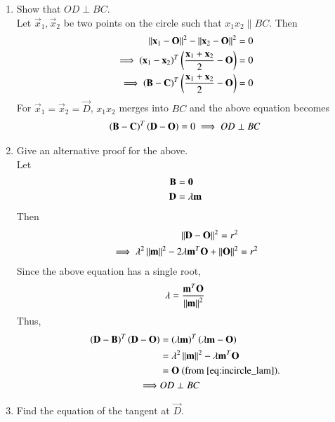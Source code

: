 \begin{enumerate}[label=\arabic*.,ref=\thesubsection.\theenumi]
\item Show that $OD \perp BC$.
%
\\
\solution Let $\vec{x}_1,\vec{x}_2$ be two points on the circle such that 
$x_1x_2 \parallel BC$. Then
%
\begin{align}
\left\lVert\mathbf{x}_1-\mathbf{O}\right\rVert^2- 
\left\lVert\mathbf{x}_2-\mathbf{O}\right\rVert^2 &= 0 
\\
\implies 
\left(\mathbf{x}_1-\mathbf{x}_2\right)^T\left(\frac{\mathbf{x}_1+\mathbf{x}_2}{2}-\mathbf{O}\right) &= 
0 
\\
\implies 
\left(\mathbf{B}-\mathbf{C}\right)^T\left(\frac{\mathbf{x}_1+\mathbf{x}_2}{2}-\mathbf{O}\right) &= 
0 
\end{align}
%
For $\vec{x}_1=\vec{x}_2=\vec{D}$, $x_1x_2$ merges into $BC$ and the above 
equation becomes 
%
\begin{align}
\left(\mathbf{B}-\mathbf{C}\right)^T\left(\mathbf{D}-\mathbf{O}\right) = 
0 
\implies OD \perp BC
\end{align}
%
\item Give an alternative proof for the above.
\\
\solution Let 
\begin{align}
\mathbf{B} & = \mathbf{0}
\\
\mathbf{D} &= \lambda \mathbf{m}
\end{align}
Then
\begin{align}
\left\lVert\mathbf{D} - \mathbf{O}\right\rVert^2 = r^2 &
\\
\implies \lambda^2\left\lVert\mathbf{m}\right\rVert^2 - 2\lambda\mathbf{m}^T\mathbf{O} + \left\lVert\mathbf{O}\right\rVert^2 &= r^2 
\end{align}
Since the above equation has a single root,
\begin{align}
\lambda = \frac{\mathbf{m}^T\mathbf{O}}{\left\lVert\mathbf{m}\right\rVert^2}
\label{eq:incircle_lam}
\end{align}
%
Thus, 
\begin{align}
\left(\mathbf{D} - \mathbf{B}\right)^T\left(\mathbf{D} - \mathbf{O}\right)
&= \left(\lambda\mathbf{m}\right)^T
\left(\lambda\mathbf{m}-\mathbf{O}\right)
\\
&=\lambda^2\left\lVert\mathbf{m}\right\rVert^2-\lambda\mathbf{m}^T\mathbf{O}
\\
&= \mathbf{O} \text{ (from \ref{eq:incircle_lam})}.
\\
\implies & OD \perp BC
\end{align}
\item Find the equation of the tangent at $\vec{D}$.

\end{enumerate}

